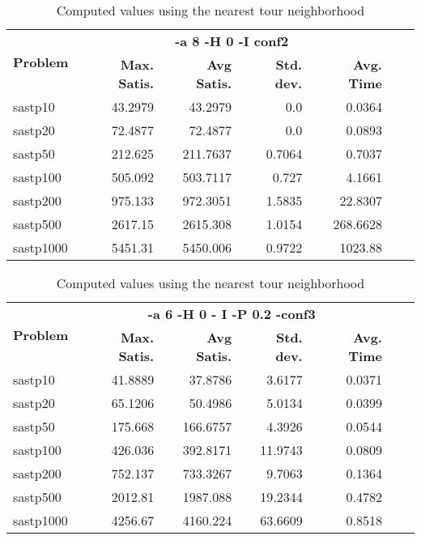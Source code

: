 \documentclass{article}
\begin{document}
\begin{table}[b!]
  \vspace{-6mm}%
  \caption{Computed values using the nearest tour neighborhood}
  \label{tab:NearestTour}
  \setlength{\tabcolsep}{1.4mm}
  \centering
  \begin{tabular}{lrrrrrr}
   \multirow{2}{*}{\bfseries Problem} &
      \multicolumn{4}{c}{\bfseries -a 8 -H 0 -I  conf2} \\
    &
    \bfseries Max. Satis. &
    \bfseries Avg Satis. &
    \bfseries Std. dev. &
    \bfseries Avg. Time 
    \\\hline
   sastp10 & 43.2979 & 43.2979 & 0.0 & 0.0364 \\ 
sastp20 & 72.4877 & 72.4877 & 0.0 & 0.0893 \\ 
sastp50 & 212.625 & 211.7637 & 0.7064 & 0.7037 \\ 
sastp100 & 505.092 & 503.7117 & 0.727 & 4.1661 \\ 
sastp200 & 975.133 & 972.3051 & 1.5835 & 22.8307 \\ 
sastp500 & 2617.15 & 2615.308 & 1.0154 & 268.6628 \\ 
sastp1000 & 5451.31 & 5450.006 & 0.9722 & 1023.88
    \\\hline
  \end{tabular}

\end{table}


\begin{table}[b!]
  \vspace{-6mm}%
  \caption{Computed values using the nearest tour neighborhood}
  \label{tab:NearestTour}
  \setlength{\tabcolsep}{1.4mm}
  \centering
  \begin{tabular}{lrrrrrr}
   \multirow{2}{*}{\bfseries Problem} &
      \multicolumn{4}{c}{\bfseries -a 6 -H 0 - I -P 0.2 -conf3 } \\
    &
    \bfseries Max. Satis. &
    \bfseries Avg Satis. &
    \bfseries Std. dev. &
    \bfseries Avg. Time 
    \\\hline
    sastp10 & 41.8889 & 37.8786 & 3.6177 & 0.0371 \\ 
sastp20 & 65.1206 & 50.4986 & 5.0134 & 0.0399 \\ 
sastp50 & 175.668 & 166.6757 & 4.3926 & 0.0544 \\ 
sastp100 & 426.036 & 392.8171 & 11.9743 & 0.0809 \\ 
sastp200 & 752.137 & 733.3267 & 9.7063 & 0.1364 \\ 
sastp500 & 2012.81 & 1987.088 & 19.2344 & 0.4782 \\ 
sastp1000 & 4256.67 & 4160.224 & 63.6609 & 0.8518

    \\\hline
  \end{tabular}

\end{table}
\end{document}
